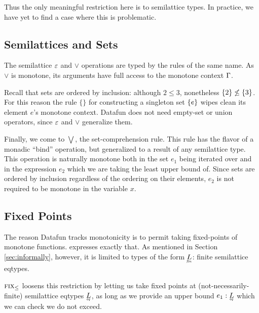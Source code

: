 Thus the only meaningful restriction here is to semilattice types. In practice,
we have yet to find a case where this is problematic.


\subsection{Semilattices and Sets}
The semilattice $\varepsilon$ and $\vee$ operations are typed by the rules of the same
name. As $\vee$ is monotone, its arguments have full access to the monotone
context $\Gamma$.

Recall that sets are ordered by inclusion: although $2 \le 3$, nonetheless
$\{2\} \not\le \{3\}$. For this reason the rule $\{\}$ for
constructing a singleton set $\{e\}$ wipes clean its element $e$'s
monotone context. Datafun does not need empty-set or union operators, since
$\varepsilon$ and $\vee$ generalize them.

Finally, we come to $\bigvee$, the set-comprehension rule. This rule has the
flavor of a monadic ``bind'' operation, but generalized to a result of any
semilattice type. This operation is naturally monotone both in the set $e_1$
being iterated over and in the expression $e_2$ which we are taking the least
upper bound of. Since sets are ordered by inclusion regardless of the ordering
on their elements, $e_2$ is not required to be monotone in the variable $x$.


\subsection{Fixed Points}

The reason Datafun tracks monotonicity is to permit taking fixed-points of
monotone functions.  expresses exactly that. As mentioned in Section
\ref{sec:informally}, however, it is limited to types of the form $\fineq{L}$:
finite semilattice eqtypes.

$\textsc{fix}_\le$ loosens this restriction by letting us take fixed points at
(not-necessarily-finite) semilattice eqtypes $\eq{L}$, as long as we provide an
upper bound $e_1 : \eq{L}$ which we can check we do not exceed.
